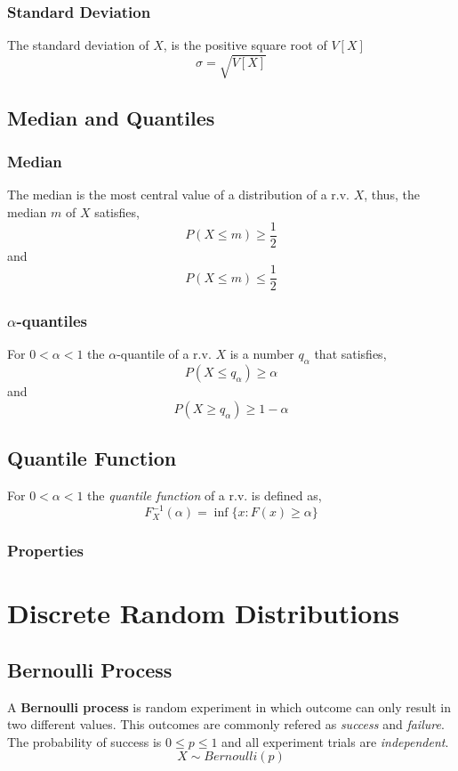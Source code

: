 \subsubsection{Standard Deviation}
The standard deviation of $X$, is the positive square root of $V[X]$
\[ \sigma = \sqrt{V[X]} \]


\subsection{Median and Quantiles}
\subsubsection{Median}
The median is the most central value of a distribution of a r.v. $X$, thus, the
median $m$ of $X$ satisfies,
\[ P(X \leq m) \geq \frac{1}{2} \] and
\[ P(X \leq m) \leq \frac{1}{2} \]

\subsubsection{$\alpha$-quantiles}
For $0 < \alpha < 1$ the $\alpha$-quantile of a r.v. $X$ is a number $q_\alpha$
that satisfies,
\[ P(X \leq q_\alpha) \geq \alpha \] and
\[ P(X \geq q_\alpha) \geq 1- \alpha \]

\subsection{Quantile Function}
For $0 < \alpha < 1$ the \textit{quantile function} of a r.v. is defined as,
\[ F^{-1}_X (\alpha) = \inf \{ x : F(x) \geq \alpha  \} \]

\subsubsection{Properties}

\section{Discrete Random Distributions}
\subsection{Bernoulli Process}
A \textbf{Bernoulli process} is random experiment in which outcome can only
result in two different values. This outcomes are commonly refered as
\textit{success} and \textit{failure}. The probability of success is $0 \leq p
\leq 1$ and all experiment trials are \textit{independent}.
\[ X \sim Bernoulli(p) \]

